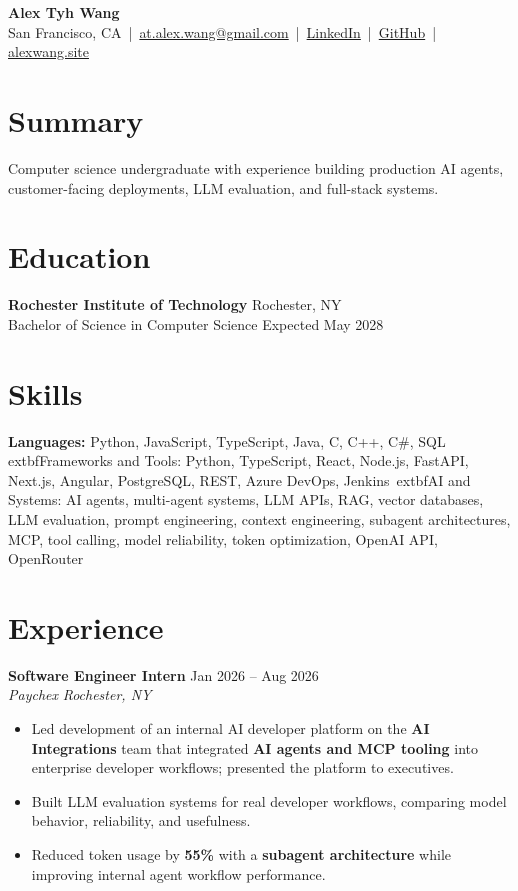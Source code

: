 \documentclass[10pt,letterpaper]{article}
\newif\ifresumeFirstRole
\newcommand{\resumeRole}[4]{%
  \ifresumeFirstRole
    \global\resumeFirstRolefalse
  \else
    \vspace{0pt plus 1fill}%
  \fi
  \textbf{#1} \hfill #2\\
  \textit{#3} \hfill \textit{#4}
}
\begin{document}
\begin{center}
{\Large \textbf{Alex Tyh Wang}}\\
San Francisco, CA \,|\, \href{mailto:at.alex.wang@gmail.com}{at.alex.wang@gmail.com} \,|\, \href{https://www.linkedin.com/in/alex-tyh-wang/}{LinkedIn} \,|\, \href{https://github.com/alextyhwang}{GitHub} \,|\, \href{https://alexwang.site}{alexwang.site}
\end{center}

\section*{Summary}
Computer science undergraduate with experience building production AI agents, customer-facing deployments, LLM evaluation, and full-stack systems.

\section*{Education}
\textbf{Rochester Institute of Technology} \hfill Rochester, NY\\
Bachelor of Science in Computer Science \hfill Expected May 2028

\section*{Skills}
\textbf{Languages:} Python, JavaScript, TypeScript, Java, C, C++, C\#, SQL\\
	extbf{Frameworks and Tools:} Python, TypeScript, React, Node.js, FastAPI, Next.js, Angular, PostgreSQL, REST, Azure DevOps, Jenkins\
	extbf{AI and Systems:} AI agents, multi-agent systems, LLM APIs, RAG, vector databases, LLM evaluation, prompt engineering, context engineering, subagent architectures, MCP, tool calling, model reliability, token optimization, OpenAI API, OpenRouter

\section*{Experience}
\resumeRole{Software Engineer Intern}{Jan 2026 -- Aug 2026}{Paychex}{Rochester, NY}
\begin{itemize}
  \item Led development of an internal AI developer platform on the \textbf{AI Integrations} team that integrated \textbf{AI agents and MCP tooling} into enterprise developer workflows; presented the platform to executives.
  \item Built LLM evaluation systems for real developer workflows, comparing model behavior, reliability, and usefulness.
  \item Reduced token usage by \textbf{55\%} with a \textbf{subagent architecture} while improving internal agent workflow performance.
\end{itemize}
\end{document}
